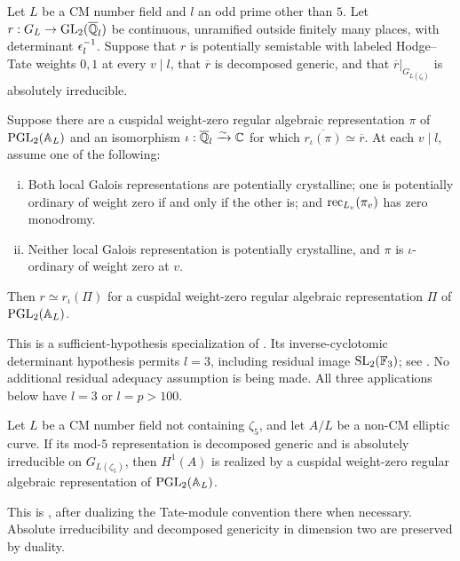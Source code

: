 \begin{theorem}\label{aut:lift}
Let $L$ be a CM number field and $l$ an odd prime other than $5$. Let
$r:G_L\to\operatorname{GL}_2(\overline{\mathbb Q}_l)$ be continuous, unramified outside finitely
many places, with determinant $\epsilon_l^{-1}$. Suppose that $r$ is potentially
semistable with labeled Hodge--Tate weights $0,1$ at every $v\mid l$,
that $\overline r$ is decomposed generic, and that
$\overline r|_{G_{L(\zeta_l)}}$ is absolutely irreducible.

Suppose there are a cuspidal weight-zero regular algebraic representation
$\pi$ of $\operatorname{PGL}_2(\mathbb A_L)$ and an isomorphism
$\iota:\overline{\mathbb Q}_l\xrightarrow{\sim}\mathbb C$ for which
$\overline{r_\iota(\pi)}\simeq\overline r$. At each $v\mid l$, assume one
of the following:
\begin{enumerate}[(i)]
\item Both local Galois representations are potentially crystalline;
one is potentially ordinary of weight zero if and only if the other is; and
$\operatorname{rec}_{L_v}(\pi_v)$ has zero monodromy.
\item Neither local Galois representation is potentially crystalline,
and $\pi$ is $\iota$-ordinary of weight zero at $v$.
\end{enumerate}
Then $r\simeq r_\iota(\Pi)$ for a cuspidal weight-zero regular algebraic
representation $\Pi$ of $\operatorname{PGL}_2(\mathbb A_L)$.
\end{theorem}

This is a sufficient-hypothesis specialization of
\cite[Theorem~5.2]{CN}. Its inverse-cyclotomic determinant hypothesis permits
$l=3$, including residual image $\operatorname{SL}_2(\mathbb F_3)$; see
\cite[Remark~5.2.2]{CN}. No additional residual adequacy assumption is being
made. All three applications below have $l=3$ or $l=p>100$.

\begin{theorem}\label{aut:seed}
Let $L$ be a CM number field not containing $\zeta_5$, and let $A/L$ be a
non-CM elliptic curve. If its mod-$5$ representation is decomposed generic
and is absolutely irreducible on $G_{L(\zeta_5)}$, then $H^1(A)$ is realized
by a cuspidal weight-zero regular algebraic representation of
$\operatorname{PGL}_2(\mathbb A_L)$.
\end{theorem}

This is \cite[Theorem~6.1 and Lemma~6.1.3]{CN}, after dualizing the Tate-module
convention there when necessary. Absolute irreducibility and decomposed
genericity in dimension two are preserved by duality.

